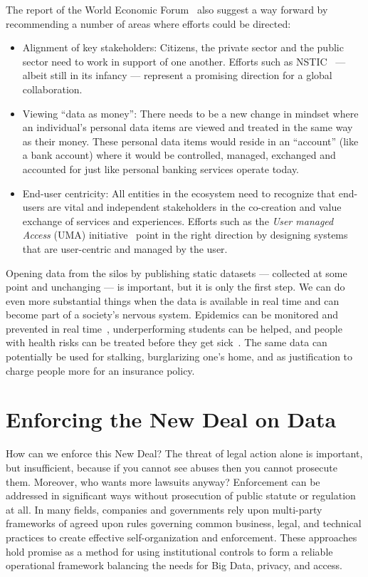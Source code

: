 The report of the World Economic Forum~\cite{WEF2011} also suggest a way forward by recommending
a number of areas where efforts could be directed:
\begin{itemize}
\item Alignment of key stakeholders:  
Citizens, the private sector and the public sector
need to work in support of one another.
Efforts such as NSTIC~\cite{NSTIC2011} --- albeit still in its infancy ---
represent a promising direction
for a global collaboration.


\item Viewing ``data as money'':
There needs to be a new change in mindset where
an individual's personal data items are viewed
and treated in the same way as their money.
These personal data items would reside in an ``account'' (like a bank account)
 where it would be controlled, managed, exchanged and 
accounted for just like personal banking services operate today.


\item End-user centricity:  All entities in the ecosystem need to
recognize that end-users are vital and 
independent stakeholders in the co-creation 
and value exchange of services and experiences.
Efforts such as the {\em User managed Access} (UMA) initiative~\cite{UMAcore}
point in the right direction by designing systems that are
user-centric and managed by the user.


\end{itemize}

Opening data from the silos by publishing static datasets --- collected at some point and unchanging --- is important, but it is only the first step.
We can do even more substantial things when the data is available in real time and can become part of a society's nervous system.
Epidemics can be monitored and prevented in real time~\cite{pentland2009using}, underperforming students can be helped, and people with health risks can be treated before they get sick~\cite{tacconi2008activity}. The same data can potentially be used for stalking, burglarizing one's home, and as justification to charge people more for an insurance policy.

\section{Enforcing the New Deal on Data }

How can we enforce this New Deal?
The threat of legal action alone is important, but insufficient, because if you cannot see abuses then you cannot prosecute them.
Moreover, who wants more lawsuits anyway?
Enforcement can be addressed in significant ways without prosecution of public statute or regulation at all.
In many fields, companies and governments rely upon multi-party frameworks of agreed upon rules governing common business, legal, and technical practices to create effective self-organization and enforcement.
These approaches hold promise as a method for using institutional controls to form a reliable operational framework balancing the needs for Big Data, privacy, and access.

